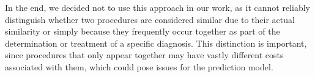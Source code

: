 In the end, we decided not to use this approach in our work, as it cannot reliably distinguish whether two procedures are considered similar due to their actual similarity or simply because they frequently occur together as part of the determination or treatment of a specific diagnosis. This distinction is important, since procedures that only appear together may have vastly different costs associated with them, which could pose issues for the prediction model.